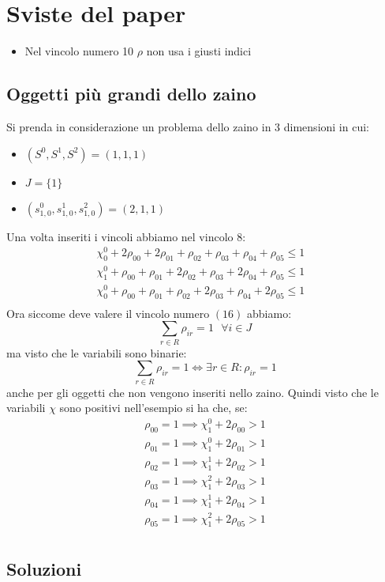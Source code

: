 \documentclass{scrartcl}
\begin{document}
\section{Sviste del paper}
\begin{itemize}
	\item Nel vincolo numero 10 $\rho$ non usa i giusti indici
\end{itemize}

\subsection{Oggetti più grandi dello zaino}
Si prenda in considerazione un problema dello zaino in 3 dimensioni in cui:
\begin{itemize}
	\item $(S^0,S^1,S^2) = (1,1,1)$
	\item $J = \{1\}$
	\item $(s_{1, 0}^0,s_{1,0}^1, s_{1,0}^2) = (2,1,1)$
\end{itemize}
Una volta inseriti i vincoli abbiamo nel vincolo 8:
$$
\begin{array}{ll}
\chi_0^0 + 2 \rho_{00} + 2 \rho_{01} + \rho_{02} + \rho_{03} + \rho_{04} + \rho_{05} \leq 1 & \\
\chi_1^0 +  \rho_{00} +  \rho_{01} + 2 \rho_{02} + \rho_{03} + 2 \rho_{04} + \rho_{05} \leq 1 & \\
\chi_0^0 +  \rho_{00} +  \rho_{01} + \rho_{02} + 2 \rho_{03} + \rho_{04} + 2 \rho_{05} \leq 1 & \\
\end{array}
$$
Ora siccome deve valere il vincolo numero $(16)$ abbiamo:
$$
\sum_{r\in R} \rho_{ir} = 1 \ \ \ \forall i \in J
$$
ma visto che le variabili sono binarie:
$$
\sum_{r\in R} \rho_{ir} = 1 \iff \exists r \in R : \rho_{ir} = 1
$$
anche per gli oggetti che non vengono inseriti nello zaino.
Quindi visto che le variabili $\chi$ sono positivi nell'esempio si ha che, se:
$$
\begin{array}{l}
\rho_{00} = 1 \implies \chi_1^0 + 2 \rho_{00} > 1 \\
\rho_{01} = 1 \implies \chi_1^0 + 2 \rho_{01} > 1 \\
\rho_{02} = 1 \implies \chi_1^1 + 2 \rho_{02} > 1 \\
\rho_{03} = 1 \implies \chi_1^2 + 2 \rho_{03} > 1 \\
\rho_{04} = 1 \implies \chi_1^1 + 2 \rho_{04} > 1 \\
\rho_{05} = 1 \implies \chi_1^2 + 2 \rho_{05} > 1 \\
\end{array}
$$

\subsection{Soluzioni}
\end{document}
